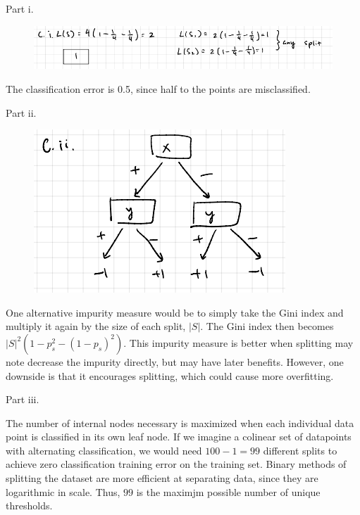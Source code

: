 \begin{solution}
Part i.

\begin{figure}[H]
    \begin{center}
    \includegraphics[width=\textwidth]{images/1c1.PNG}
    \end{center}
\end{figure}

The classification error is 0.5, since half to the points are misclassified.

Part ii.

\begin{figure}[H]
    \begin{center}
    \includegraphics[]{images/1c2.PNG}
    \end{center}
\end{figure}

One alternative impurity measure would be to simply take the Gini index and multiply it again by the size of each split, $|S|$. The Gini index then becomes $|S|^2 (1 - p_s^2 - (1-p_s)^2)$. This impurity measure is better when splitting may note decrease the impurity directly, but may have later benefits. However, one downside is that it encourages splitting, which could cause more overfitting.

Part iii.

The number of internal nodes necessary is maximized when each individual data point is classified in its own leaf node. If we imagine a colinear set of datapoints with alternating classification, we would need $100-1 = 99$ different splits to achieve zero classification training error on the training set. Binary methods of splitting the dataset are more efficient at separating data, since they are logarithmic in scale. Thus, $99$ is the maximjm possible number of unique thresholds.
\end{solution}

